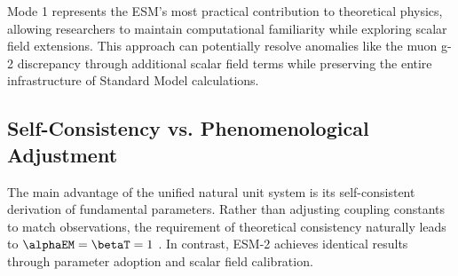 	Mode 1 represents the ESM's most practical contribution to theoretical physics, allowing researchers to maintain computational familiarity while exploring scalar field extensions. This approach can potentially resolve anomalies like the muon g-2 discrepancy \cite{pascher_muon_g2_2025} through additional scalar field terms while preserving the entire infrastructure of Standard Model calculations.
	
	\subsection{Self-Consistency vs. Phenomenological Adjustment}
	\label{subsec:self_consistency_comparison}
	
	\begin{table}[ht]
		\centering
		\caption{Comparison of theoretical foundations}
		\label{tab:theoretical_foundations}
	\end{table}
	
	The main advantage of the unified natural unit system is its self-consistent derivation of fundamental parameters. Rather than adjusting coupling constants to match observations, the requirement of theoretical consistency naturally leads to $\alphaEM = \betaT = 1$ \cite{pascher_unified_2025}. In contrast, ESM-2 achieves identical results through parameter adoption and scalar field calibration.
	
